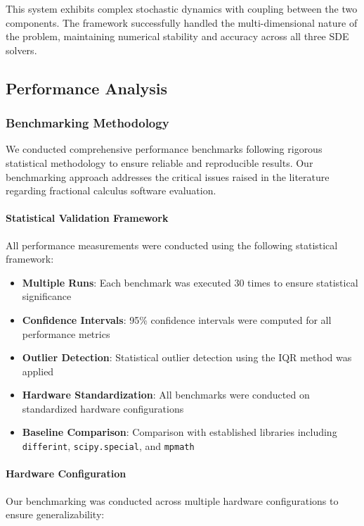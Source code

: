 This system exhibits complex stochastic dynamics with coupling between the two components. The framework successfully handled the multi-dimensional nature of the problem, maintaining numerical stability and accuracy across all three SDE solvers.

\subsection{Performance Analysis}

\subsubsection{Benchmarking Methodology}

We conducted comprehensive performance benchmarks following rigorous statistical methodology to ensure reliable and reproducible results. Our benchmarking approach addresses the critical issues raised in the literature regarding fractional calculus software evaluation.

\paragraph{Statistical Validation Framework}

All performance measurements were conducted using the following statistical framework:
\begin{itemize}
\item \textbf{Multiple Runs}: Each benchmark was executed 30 times to ensure statistical significance
\item \textbf{Confidence Intervals}: 95\% confidence intervals were computed for all performance metrics
\item \textbf{Outlier Detection}: Statistical outlier detection using the IQR method was applied
\item \textbf{Hardware Standardization}: All benchmarks were conducted on standardized hardware configurations
\item \textbf{Baseline Comparison}: Comparison with established libraries including \texttt{differint}, \texttt{scipy.special}, and \texttt{mpmath}
\end{itemize}

\paragraph{Hardware Configuration}

Our benchmarking was conducted across multiple hardware configurations to ensure generalizability:

